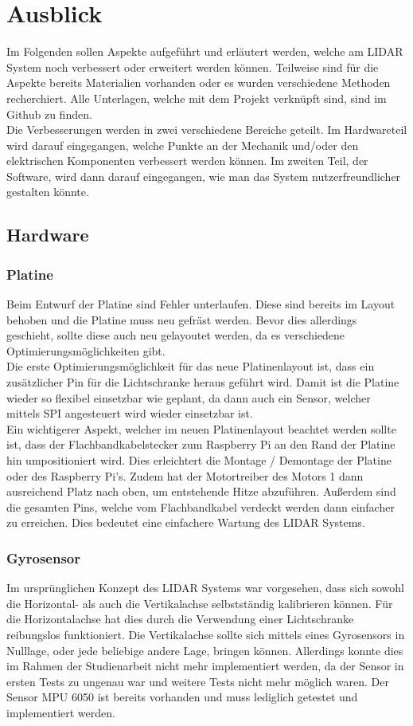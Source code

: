 \chapter{Ausblick}\label{chap:ausblick}
Im Folgenden sollen Aspekte aufgeführt und erläutert werden, welche am \ac{LIDAR} System noch verbessert oder erweitert werden können. Teilweise sind für die Aspekte bereits Materialien vorhanden oder es wurden verschiedene Methoden recherchiert. Alle Unterlagen, welche mit dem Projekt verknüpft sind, sind im Github zu finden.\\
Die Verbesserungen werden in zwei verschiedene Bereiche geteilt. Im Hardwareteil wird darauf eingegangen, welche Punkte an der Mechanik und/oder den elektrischen Komponenten verbessert werden können. Im zweiten Teil, der Software, wird dann darauf eingegangen, wie man das System nutzerfreundlicher gestalten könnte.  
\section{Hardware}
\subsection{Platine}
Beim Entwurf der Platine sind Fehler unterlaufen. Diese sind bereits im Layout behoben und die Platine muss neu gefräst werden. Bevor dies allerdings geschieht, sollte diese auch neu gelayoutet werden, da es verschiedene Optimierungsmöglichkeiten gibt. \\
Die erste Optimierungsmöglichkeit für das neue Platinenlayout ist, dass ein zusätzlicher Pin für die Lichtschranke heraus geführt wird. Damit ist die Platine wieder so flexibel einsetzbar wie geplant, da dann auch ein Sensor, welcher mittels \ac{SPI} angesteuert wird wieder einsetzbar ist.\\
Ein wichtigerer Aspekt, welcher im neuen Platinenlayout beachtet werden sollte ist, dass der Flachbandkabelstecker zum Raspberry Pi an den Rand der Platine hin umpositioniert wird. Dies erleichtert die Montage / Demontage der Platine oder des Raspberry Pi's. Zudem hat der Motortreiber des Motors 1 dann ausreichend Platz nach oben, um entstehende Hitze abzuführen. Außerdem sind die gesamten Pins, welche vom Flachbandkabel verdeckt werden dann einfacher zu erreichen. Dies bedeutet eine einfachere Wartung des \ac{LIDAR} Systems.
\subsection{Gyrosensor}
Im ursprünglichen Konzept des \ac{LIDAR} Systems war vorgesehen, dass sich sowohl die Horizontal- als auch die Vertikalachse selbstständig kalibrieren können. Für die Horizontalachse hat dies durch die Verwendung einer Lichtschranke reibungslos funktioniert. Die Vertikalachse sollte sich mittels eines Gyrosensors in Nulllage, oder jede beliebige andere Lage, bringen können. Allerdings konnte dies im Rahmen der Studienarbeit nicht mehr implementiert werden, da der Sensor in ersten Tests zu ungenau war und weitere Tests nicht mehr möglich waren. Der Sensor MPU 6050 ist bereits vorhanden und muss lediglich getestet und implementiert werden.
